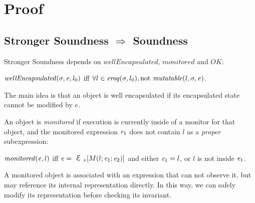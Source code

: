 \begin{comment}
sound to your own terms
  invariant protocol 2 parts
    1where is supposed to hold
    2where is acually checked

D/E/J 
-expected: before/after pmc and after constructor
-checked: before/after pmc and after constructor  
*sound (while carefully about non pure invariants) 
*not good for reasoning [flexible object invariants]
*slow

spec\#
-expected:  default contract implies peer-valid
-checked: after every field update, constructors and expose-statement (pack/unpack in literature)
  
L42:
-expected: the result of any expression and subexpression is deeply valid,
  except for 'this' inside of constructors and 'invaliant' methods.
-checks: after every field update, after the constructors, after every exposer.

implies: whenever a method or constructor is called, the ROG of all parameters is valid.
if the method is not ``invariant'' then also the ROG of this is valid.

 Microsoft code contracts
 JML
\end{comment}
\newpage
\section{Proof}
\label{s:proof}

\subsection{Stronger Soundness $\Rightarrow$ Soundness}
\saveSpace
Stronger Soundness depends on
$\mathit{wellEncapsulated}$, $\mathit{monitored}$
and $OK$:

\indent $\mathit{wellEncapsulated}(\sigma,{\mathit{e}},l_0)$ iff
$\forall l \in \mathit{erog}(\sigma,l_0), \text{not}\ \mathit{mutatable}(l,\sigma,{\mathit{e}})$.\loseSpace

\noindent The main idea is that an object is well encapsulated if its encapsulated state cannot be
modified by $e$.

An object is \emph{monitored} if execution
is currently inside of a monitor for that object, and
the monitored expression ${\mathit{e}}_1$ does not
contain $l$ as a \emph{proper} subexpression:

\indent $\mathit{monitored}({\mathit{e}},l)$ iff
$\e=\ctx_v[M(l;\e_1;\e_2)]$ and either ${\mathit{e}}_1=l$, or $l$ is not inside ${\mathit{e}}_1$.\loseSpace

A monitored object is associated with an expression that can not observe it, but may
reference its internal representation directly.
In this way, we can safely modify its representation before checking its invariant.

